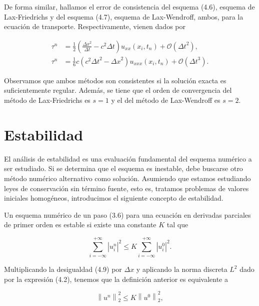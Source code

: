 De forma similar, hallamos el error de consistencia del
esquema (4.6), esquema de Lax-Friedrichs y del esquema (4.7),
esquema de Lax-Wendroff, ambos, para la ecuación de transporte.
Respectivamente, vienen dados por

\begin{align*}
  \tau^{n} & =
  \frac{1}{2}
  \left(
  \frac{{\Delta x}^{2}}{\Delta t}-
  c^{2}\Delta t
  \right)
  u_{xx}
  \left(x_{i},t_{n}\right)+
  \mathcal{O}
  \left({\Delta t}^{2}\right), \\
  \tau^{n} & =
  \frac{1}{6}
  c
  \left(
  c^{2}{\Delta t}^{2}-
  {\Delta x}^{2}
  \right)
  u_{xxx}\left(x_{i},t_{n}\right)+
  \mathcal{O}\left({\Delta t}^{3}\right).
\end{align*}

Observamos que ambos métodos son consistentes si la solución exacta
es suficientemente regular.
Además, se tiene que el orden de convergencia del método de
Lax-Friedrichs es $s=1$ y el del método de Lax-Wendroff es $s=2$.

\section{Estabilidad}

El análisis de estabilidad es una evaluación fundamental del esquema
numérico a ser estudiado.
Si se determina que el esquema es inestable, debe buscarse otro
método numérico alternativo como solución.
Asumiendo que estamos estudiando leyes de conservación sin
término fuente, esto es, tratamos problemas de valores iniciales
homogéneos, introducimos el siguiente concepto de estabilidad.

\begin{definition}
  Un esquema numérico de un paso (3.6) para una ecuación en derivadas
  parciales de primer orden es estable si existe una constante $K$
  tal que

  \begin{equation*}
    \sum_{i=-\infty}^{+\infty}
    {\left|u^{n}_{i}\right|}^{2}\leq
    K
    \sum_{i=-\infty}^{+\infty}
    {\left|u^{0}_{i}\right|}^{2}.
  \end{equation*}
\end{definition}

Multiplicando la desigualdad (4.9) por $\Delta x$ y aplicando la
norma discreta $L^{2}$ dado por la expresión (4.2), tenemos que
la definición anterior es equivalente a

\begin{equation*}
  {\left\|u^{n}\right\|}^{2}_{2}\leq
  K
  {\left\|u^{0}\right\|}^{2}_{2},
\end{equation*}

